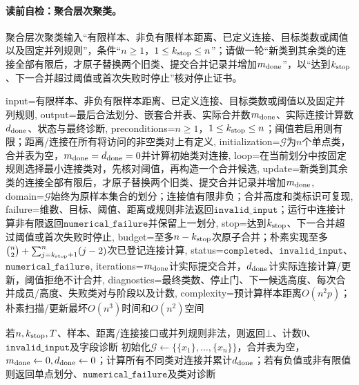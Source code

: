 \paragraph{读前自检：聚合层次聚类。}聚合层次聚类输入“有限样本、非负有限样本距离、已定义连接、目标类数或阈值以及固定并列规则”，条件“$n\ge1$，$1\le k_{\rm stop}\le n$”；请做一轮“新类到其余类的连接全部有限后，才原子替换两个旧类、提交合并记录并增加$m_{\rm done}$”，以“达到$k_{\rm stop}$、下一合并超过阈值或首次失败时停止”核对停止证书。\par

\begin{AlgorithmContract}{
  input={有限样本、非负有限样本距离、已定义连接、目标类数或阈值以及固定并列规则},
  output={最后合法划分、嵌套合并表、实际合并数$m_{\rm done}$、实际连接计算数$d_{\rm done}$、状态与最终诊断},
  preconditions={$n\ge1$，$1\le k_{\rm stop}\le n$；阈值若启用则有限；距离/连接在所有将访问的非空类对上有定义},
  initialization={$\mathcal G$为$n$个单点类，合并表为空，$m_{\rm done}=d_{\rm done}=0$并计算初始类对连接},
  loop={在当前划分中按固定规则选择最小连接类对，先核对阈值，再构造一个合并候选},
  update={新类到其余类的连接全部有限后，才原子替换两个旧类、提交合并记录并增加$m_{\rm done}$},
  domain={$\mathcal G$始终为原样本集合的划分；连接值有限非负；合并高度和类标识可复现},
  failure={维数、目标、阈值、距离或规则非法返回$\mathtt{invalid\_input}$；运行中连接计算非有限返回$\mathtt{numerical\_failure}$并保留上一划分},
  stop={达到$k_{\rm stop}$、下一合并超过阈值或首次失败时停止},
  budget={至多$n-k_{\rm stop}$次原子合并；朴素实现至多$\binom n2+\sum_{j=k_{\rm stop}+1}^{n}(j-2)$次已登记连接计算},
  status={$\mathtt{completed}$、$\mathtt{invalid\_input}$、$\mathtt{numerical\_failure}$},
  iterations={$m_{\rm done}$计实际提交合并，$d_{\rm done}$计实际连接计算/更新，阈值拒绝不计合并},
  diagnostics={最终类数、停止门、下一候选高度、每次合并成员/高度、失败类对与阶段以及计数},
  complexity={预计算样本距离$O(n^2p)$；朴素扫描/更新最坏$O(n^3)$时间和$O(n^2)$空间}
}
\begin{algorithm}[!t]
\caption{聚合层次聚类}\label{alg:V4-C02-agglomerative}
若$n,k_{\rm stop},T$、样本、距离/连接接口或并列规则非法，则返回$\bot$、计数$0$、$\mathtt{invalid\_input}$及字段诊断\;
初始化$\mathcal G\leftarrow\{\{x_1\},\ldots,\{x_n\}\}$，合并表为空，$m_{\rm done}\leftarrow0,d_{\rm done}\leftarrow0$；计算所有不同类对连接并累计$d_{\rm done}$；若有负值或非有限值则返回单点划分、$\mathtt{numerical\_failure}$及类对诊断\;

\end{algorithm}
\end{AlgorithmContract}
